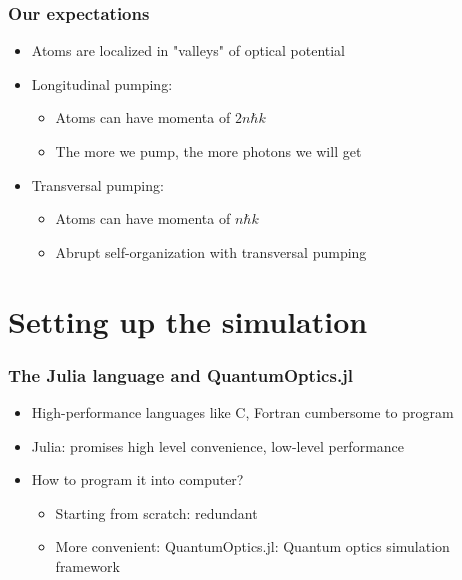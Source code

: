\documentclass[pdflatex,compress]{beamer}
\begin{document}
\begin{frame}
\frametitle{Our expectations}
\begin{itemize}
	\item Atoms are localized in "valleys" of optical potential
	\item Longitudinal pumping:
		\begin{itemize}
			\item Atoms can have momenta of $2 n \hbar k$
			\item The more we pump, the more photons we will get
		\end{itemize}
	\item Transversal pumping:
		\begin{itemize}
			\item Atoms can have momenta of $n \hbar k$
			\item Abrupt self-organization with transversal pumping
		\end{itemize}
\end{itemize}
\end{frame}

\section{Setting up the simulation}

\begin{frame}
\frametitle{The Julia language and QuantumOptics.jl}
\begin{itemize}
	\item High-performance languages like C, Fortran cumbersome to program
	\item Julia: promises high level convenience, low-level performance \cite{julialang}
	\item How to program it into computer?
	\begin{itemize}
		\item Starting from scratch: redundant
		\item More convenient: QuantumOptics.jl: Quantum optics simulation framework \cite{qojulia}	
	\end{itemize}
\end{itemize}
\end{frame}
\end{document}
